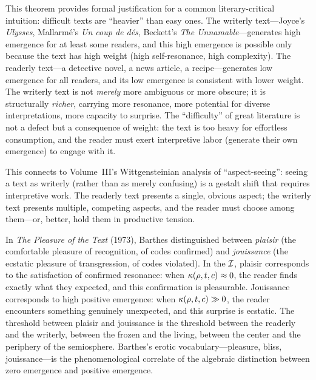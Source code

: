\begin{interpretation}
This theorem provides formal justification for a common literary-critical intuition: difficult texts are ``heavier'' than easy ones. The writerly text---Joyce's \textit{Ulysses}, Mallarm\'e's \textit{Un coup de d\'es}, Beckett's \textit{The Unnamable}---generates high emergence for at least some readers, and this high emergence is possible only because the text has high weight (high self-resonance, high complexity). The readerly text---a detective novel, a news article, a recipe---generates low emergence for all readers, and its low emergence is consistent with lower weight. The writerly text is not \emph{merely} more ambiguous or more obscure; it is structurally \emph{richer}, carrying more resonance, more potential for diverse interpretations, more capacity to surprise. The ``difficulty'' of great literature is not a defect but a consequence of weight: the text is too heavy for effortless consumption, and the reader must exert interpretive labor (generate their own emergence) to engage with it.

This connects to Volume~III's Wittgensteinian analysis of ``aspect-seeing'': seeing a text as writerly (rather than as merely confusing) is a gestalt shift that requires interpretive work. The readerly text presents a single, obvious aspect; the writerly text presents multiple, competing aspects, and the reader must choose among them---or, better, hold them in productive tension.
\end{interpretation}

\begin{remark}
In \textit{The Pleasure of the Text} (1973), Barthes distinguished between \emph{plaisir} (the comfortable pleasure of recognition, of codes confirmed) and \emph{jouissance} (the ecstatic pleasure of transgression, of codes violated). In the $\mathcal{I}$, plaisir corresponds to the satisfaction of confirmed resonance: when $\kappa(\rho, t, c) \approx 0$, the reader finds exactly what they expected, and this confirmation is pleasurable. Jouissance corresponds to high positive emergence: when $\kappa(\rho, t, c) \gg 0$, the reader encounters something genuinely unexpected, and this surprise is ecstatic. The threshold between plaisir and jouissance is the threshold between the readerly and the writerly, between the frozen and the living, between the center and the periphery of the semiosphere. Barthes's erotic vocabulary---pleasure, bliss, jouissance---is the phenomenological correlate of the algebraic distinction between zero emergence and positive emergence.
\end{remark}

